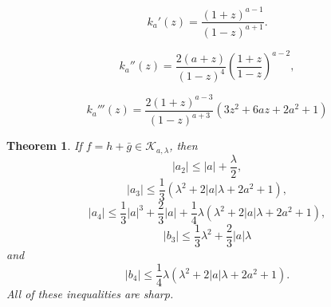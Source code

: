 \documentclass[10pt,a4paper]{amsart}
\newtheorem{theorem}{Theorem}
\newcommand{\abs}[1]{\left\vert#1\right\vert}
\begin{document}
\begin{equation}\label{T2-3} 	  k_a'(z)=\dfrac{{(1+z)}^{a-1}}{{(1-z)}^{a+1}}.
	\end{equation}

        \begin{equation}\label{T3-3}
            k_a''(z)=\dfrac{2(a+z)}{(1-z)^4}\left(\dfrac{1+z}{1-z}\right)^{a-2},
        \end{equation}

        \begin{equation}\label{T3-4}
            k_a'''(z)=\dfrac{2\left(1+z\right)^{a-3}}{\left(1-z\right)^{a+3}}\left(3z^2+6az+2a^2+1\right)
        \end{equation}

\begin{theorem}\label{T4}
	If $f=h+\bar{g}\in\mathcal{K}_{a,\lambda}$, then %
    $$|a_2|\leq|a|+\frac{\lambda}{2},$$ 
	$$|a_3|\leq\dfrac{1}{3}\left(\lambda^2+2\abs{a}\lambda+2a^2+1\right),$$
	$$|a_4|\leq\dfrac{1}{3}\abs{a}^3+\dfrac{2}{3}\abs{a}+
        \dfrac{1}{4}\lambda\left(\lambda^2+2\abs{a}\lambda+2a^2+1\right),$$
    $$|b_3|\leq\dfrac{1}{3}\lambda^2+\dfrac{2}{3}\abs{a}\lambda$$
and $$|b_4|\leq\dfrac{1}{4}\lambda\left(\lambda^2+2\abs{a}\lambda+2a^2+1\right).$$
All of these inequalities are sharp.
\end{theorem}
\end{document}
